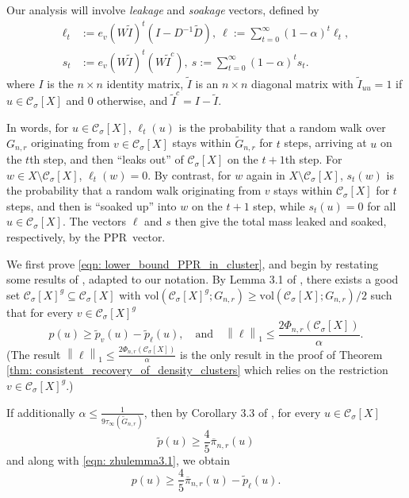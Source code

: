 \documentclass[11pt,twoside]{article}
\newcommand{\vol}{\mathrm{vol}}
\newcommand{\norm}[1]{\left\lVert#1\right\rVert}
\newcommand{\1}{\mathbf{1}}
\newcommand{\pbf}{p}        %
\newcommand{\pibf}{\pi}
\newcommand{\Xbf}{X}             %
\newcommand{\Wbf}{W}
\newcommand{\Dbf}{D}
\newcommand{\Cset}{\mathcal{C}}
\newcommand{\Csig}{\Cset_{\sigma}}
\newcommand{\pprspace}{{\sc PPR~}}
\newcommand{\wDbf}{\widetilde{\Dbf}}
\begin{document}
	Our analysis will involve \emph{leakage} and \emph{soakage} vectors, defined by
	\begin{align}
	\label{eqn: leakage_soakage}
	\ell_t & := e_v (\Wbf \widetilde{I} )^t (I - \Dbf^{-1} \wDbf),~ \ell := \sum_{t = 0}^{\infty} (1 - \alpha)^t \ell_t, \nonumber \\
	s_t & := e_v (\Wbf \widetilde{I} )^t (\Wbf \widetilde{I}^c),~ s := \sum_{t = 0}^{\infty} (1 - \alpha)^{t} s_t.
	\end{align}
	where $I$ is the $n \times n$ identity matrix, $\widetilde{I}$ is an $n \times n$ diagonal matrix with $\widetilde{I}_{uu} = 1$ if $u \in \Csig[\Xbf]$ and $0$ otherwise, and $\widetilde{I}^c = I - \widetilde{I}$.
	
	In words, for $u \in \Csig[\Xbf]$, $\ell_t(u)$ is the probability that a random walk over $G_{n,r}$ originating from $v \in \Csig[\Xbf]$ stays within $\widetilde{G}_{n,r}$ for $t$ steps, arriving at $u$ on the $t$th step, and then ``leaks out'' of $\Csig[\Xbf]$ on the $t + 1$th step. For $w \in \Xbf \setminus \Csig[\Xbf]$, $\ell_t(w) = 0$. By contrast, for $w$ again in $\Xbf \setminus \Csig[\Xbf]$, $s_t(w)$ is the probability that a random walk originating from $v$ stays within $\Csig[\Xbf]$ for $t$ steps, and then is ``soaked up'' into $w$ on the $t + 1$ step, while $s_t(u) = 0$ for all $u \in \Csig[\Xbf]$. The vectors $\ell$ and $s$ then give the total mass leaked and soaked, respectively, by the \pprspace vector. 
	
	We first prove \eqref{eqn: lower_bound_PPR_in_cluster}, and begin by restating some results of \citep{zhu2013}, adapted to our notation. By Lemma 3.1 of \citep{zhu2013}, there exists a good set $\Csig[\Xbf]^g \subseteq \Csig[\Xbf]$ with $\vol(\Csig[\Xbf]^g; G_{n,r}) \geq \vol(\Csig[\Xbf]; G_{n,r})/2$ such that for every $v \in \Csig[\Xbf]^g$
	\begin{equation}
	\label{eqn: zhulemma3.1}
	\pbf(u) \geq \widetilde{\pbf}_v(u) - \widetilde{\pbf}_{\ell}(u), \quad \textrm{and} \quad \norm{\ell}_1 \leq \frac{2 \Phi_{n,r}(\Csig[\Xbf])}{\alpha}.
	\end{equation}
	(The result $\norm{\ell}_1 \leq \frac{2 \Phi_{n,r}(\Csig[\Xbf])}{\alpha}$ is the only result in the proof of Theorem \ref{thm: consistent_recovery_of_density_clusters} which relies on the restriction $v \in \Csig[\Xbf]^g$.)
	
	If additionally $\alpha \leq \frac{1}{9\tau_{\infty}(\widetilde{G}_{n,r})}$, then by Corollary 3.3 of \citep{zhu2013}, for every $u \in \Csig[\Xbf]$
	\begin{equation*}
	\widetilde{\pbf}(u) \geq \frac{4}{5} \overline{\pibf}_{n,r}(u)
	\end{equation*}
	and along with \eqref{eqn: zhulemma3.1}, we obtain
	\begin{equation*}
	\pbf(u) \geq \frac{4}{5} \overline{\pibf}_{n,r}(u) - \widetilde{\pbf}_{\ell}(u).
	\end{equation*}
	
\end{document}

